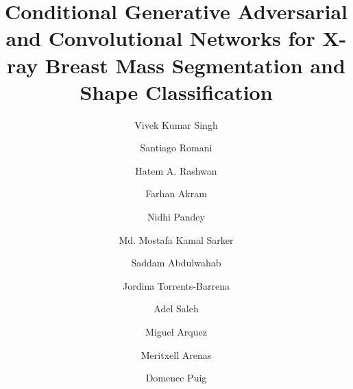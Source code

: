 \documentclass[runningheads,a4paper]{llncs}
\begin{document}
\mainmatter  %

\title{Conditional Generative Adversarial and Convolutional Networks for X-ray Breast Mass Segmentation and Shape Classification}


%
%

\author{Vivek Kumar Singh \and Santiago Romani \and Hatem A. Rashwan  \and Farhan Akram \and Nidhi Pandey \and Md. Mostafa Kamal Sarker \and Saddam Abdulwahab\and Jordina Torrents-Barrena \and Adel Saleh \and Miguel Arquez\and Meritxell Arenas\and
Domenec Puig}


%




%
%

\maketitle
\end{document}
